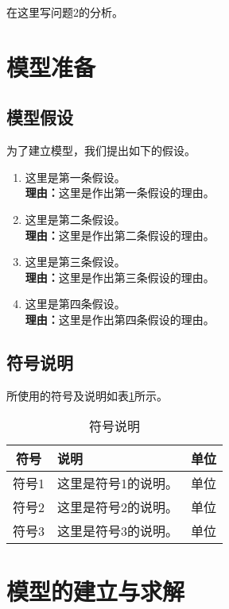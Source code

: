 \documentclass[12pt, a4paper, oneside]{ctexart}
\begin{document}
在这里写问题2的分析。

\section{模型准备}

\subsection{模型假设}

为了建立模型，我们提出如下的假设。

\begin{enumerate}
    \item 这里是第一条假设。
    \\\textbf{理由：}这里是作出第一条假设的理由。
    \item 这里是第二条假设。
    \\\textbf{理由：}这里是作出第二条假设的理由。
    \item 这里是第三条假设。
    \\\textbf{理由：}这里是作出第三条假设的理由。
    \item 这里是第四条假设。
    \\\textbf{理由：}这里是作出第四条假设的理由。
\end{enumerate}

\subsection{符号说明}

所使用的符号及说明如表\ref{table1}所示。

\begin{table}[h]
    \caption{符号说明}\label{table1}
    \centering
    \begin{tabular}{clc}
        \hline
        \textbf{符号} & \textbf{说明}        & \textbf{单位}   \\ \hline
        符号1         & 这里是符号1的说明。  & 单位             \\
        符号2         & 这里是符号2的说明。  & 单位             \\
        符号3         & 这里是符号3的说明。  & 单位             \\ \hline
    \end{tabular}
\end{table}

\section{模型的建立与求解}
\end{document}
